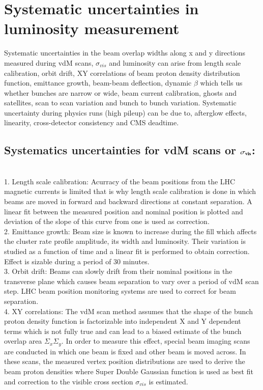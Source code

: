 \section{Systematic uncertainties in luminosity measurement}
\label{sec:syst}

Systematic uncertainties in the beam overlap widths along x and y directions measured during vdM scans, $\sigma_{vis}$ and luminosity can arise from length scale calibration, orbit drift, XY correlations of beam proton density distribution function, emittance growth, beam-beam deflection, dynamic $\beta$ which tells us whether bunches are narrow or wide, beam current calibration, ghosts and satellites, scan to scan variation and bunch to bunch variation. Systematic uncertainty during physics runs (high pileup) can be due to, afterglow effects, linearity, cross-detector consistency and CMS deadtime. \\

\subsection{Systematics uncertainties for vdM scans or $\bf{\sigma_{vis}}$:} \\

1. Length scale calibration: Acurracy of the beam positions from the LHC magnetic currents is limited that is why length scale calibration is done in which beams are moved in forward and backward directions at constant separation. A linear fit between the measured position and nominal position is plotted and deviation of the slope of this curve from one is used as correction. \\

2. Emittance growth: Beam size is known to increase during the fill which affects the cluster rate profile amplitude, its width and luminosity. Their variation is studied as a function of time and a linear fit is performed to obtain correction. Effect is sizable during a period of 30 minutes. \\

3. Orbit drift: Beams can slowly drift from their nominal positions in the transverse plane which causes beam separation to vary over a period of vdM scan step. LHC beam position monitoring systems are used to correct for beam separation. \\

4. XY correlations: The vdM scan method assumes that the shape of the bunch proton density function is factorizable into independent X and Y dependent terms which is not fully true and can lead to a biased estimate of the bunch overlap area $\Sigma_x \Sigma_y$. In order to measure this effect, special beam imaging scans are conducted in which one beam is fixed and other beam is moved across. In these scans, the measured vertex position distributions are used to derive the beam proton densities where Super Double Gaussian function is used as best fit and correction to the visible cross section $\sigma_{vis}$ is estimated. \\

